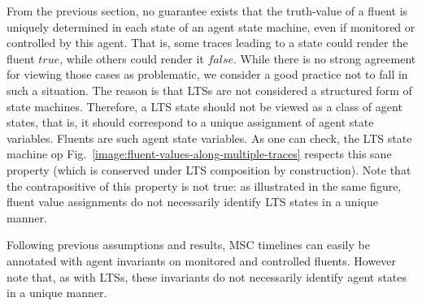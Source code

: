 From the previous section, no guarantee exists that the truth-value of a fluent is uniquely determined in each state of an agent state machine, even if monitored or controlled by this agent. That is, some traces leading to a state could render the fluent $true$, while others could render it $false$. While there is no strong agreement for viewing those cases as problematic, we consider a good practice not to fall in such a situation. The reason is that LTSs are not considered a structured form of state machines. Therefore, a LTS state should not be viewed as a class of agent states, that is, it should correspond to a unique assignment of agent state variables. Fluents are such agent state variables. As one can check, the LTS state machine op Fig.~\ref{image:fluent-values-along-multiple-traces} respects this sane property (which is conserved under LTS composition by construction). Note that the contrapositive of this property is not true: as illustrated in the same figure, fluent value assignments do not necessarily identify LTS states in a unique manner.

Following previous assumptions and results, MSC timelines can easily be annotated with agent invariants on monitored and controlled fluents. However note that, as with LTSs, these invariants do not necessarily identify agent states in a unique manner.
